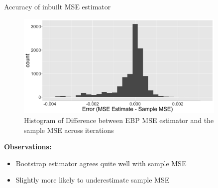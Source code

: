 \documentclass[fleqn,final]{beamer}
\newcommand{\Pheight}{\rule[-5mm]{0cm}{1cm}}
\begin{document}
\begin{frame}
\begin{columns}[t]
\begin{column}{.3\linewidth}
  \begin{block}{ Accuracy of inbuilt MSE estimator \Pheight}
	\begin{center}
	\begin{figure}
		\includegraphics[width=0.9\textwidth]{HistogramMSEEstimate}
		\caption{Histogram of Difference between EBP MSE estimator and the sample MSE across iterations}
	\end{figure}
	\end{center}
	\textbf{Observations:}
	\begin{itemize}
	\item Bootstrap estimator agrees quite well with sample MSE
	\item Slightly more likely to underestimate sample MSE
	\end{itemize}
   \end{block}
\end{column}

%
%


\end{columns}
\end{frame}
\end{document}
